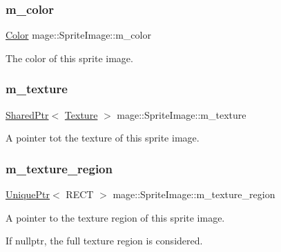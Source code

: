 \subsubsection{\texorpdfstring{m\+\_\+color}{m\_color}}
{\footnotesize\ttfamily \hyperlink{structmage_1_1_color}{Color} mage\+::\+Sprite\+Image\+::m\+\_\+color\hspace{0.3cm}{\ttfamily [private]}}

The color of this sprite image. \hypertarget{classmage_1_1_sprite_image_a8416fc862782dc019e15275261e7ca15}{}\label{classmage_1_1_sprite_image_a8416fc862782dc019e15275261e7ca15} 
\subsubsection{\texorpdfstring{m\+\_\+texture}{m\_texture}}
{\footnotesize\ttfamily \hyperlink{namespacemage_a1e01ae66713838a7a67d30e44c67703e}{Shared\+Ptr}$<$ \hyperlink{classmage_1_1_texture}{Texture} $>$ mage\+::\+Sprite\+Image\+::m\+\_\+texture\hspace{0.3cm}{\ttfamily [private]}}

A pointer tot the texture of this sprite image. \hypertarget{classmage_1_1_sprite_image_a8d20ef6d6470dc01f73a599060953b65}{}\label{classmage_1_1_sprite_image_a8d20ef6d6470dc01f73a599060953b65} 
\subsubsection{\texorpdfstring{m\+\_\+texture\+\_\+region}{m\_texture\_region}}
{\footnotesize\ttfamily \hyperlink{namespacemage_a8c307fbcc33bce9b7f2aa4c26c3b95cf}{Unique\+Ptr}$<$ R\+E\+CT $>$ mage\+::\+Sprite\+Image\+::m\+\_\+texture\+\_\+region\hspace{0.3cm}{\ttfamily [private]}}

A pointer to the texture region of this sprite image.

If {\ttfamily nullptr}, the full texture region is considered. 